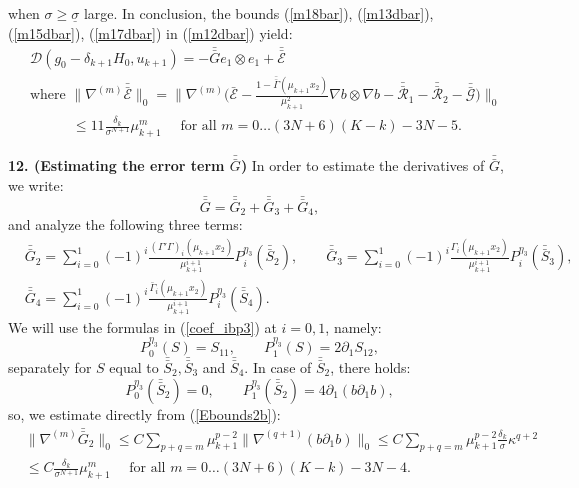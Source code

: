 \documentclass[reqno,twoside,11pt]{amsart}
\newcommand*{\dbar}[1]{\bar{\bar{#1}}}
\numberwithin{equation}{section}
\theoremstyle{plain}
\theoremstyle{definition}
\begin{document}
when $\sigma\geq \underline\sigma$ large.
In conclusion, the bounds (\ref{m18bar}), (\ref{m13dbar}), 
(\ref{m15dbar}), (\ref{m17dbar})  in (\ref{m12dbar}) yield:
\begin{equation}\label{m18dbar}
\begin{split}
& \mathcal{D}(g_0-\delta_{k+1}H_0, u_{k+1}) = - \dbar G e_1\otimes e_1 + \dbar{\mathcal{E}} \\
&\mbox{where } \|\nabla^{(m)}\dbar{\mathcal{E}}\|_0  =
\big\|\nabla^{(m)}\Big(\bar{\mathcal{E}} -
\frac{1-\dbar\Gamma(\mu_{k+1}x_2)}{\mu_{k+1}^2}\nabla b\otimes\nabla b
- \dbar{\mathcal{R}}_1 - \dbar{\mathcal{R}}_2-\dbar{\mathcal{G}}\Big)\big\|_0
\\ & \qquad\quad \leq 11\frac{\delta_k}{\sigma^{N+1}}\mu_{k+1}^m 
\quad \mbox{ for all } m=0\ldots (3N+6)(K-k)-3N-5.
\end{split}
\end{equation}

\smallskip

{\bf 12. (Estimating the error term $\dbar G$)}
In order to estimate the derivatives of $\dbar G$, we write:
$$\dbar G = \dbar G_2 + \dbar G_3 + \dbar G_4,$$
and analyze the following three terms: 
\begin{equation*}
\begin{split}
& \dbar G_2 = \sum_{i=0}^1 (-1)^i \frac{(\Gamma'\Gamma)_{i}(\mu_{k+1}x_2
  )}{\mu_{k+1}^{i+1}}P_i^{\eta_3}(\dbar S_2), \qquad
\dbar G_3 =\sum_{i=0}^1 (-1)^i \frac{\Gamma_{i}(\mu_{k+1}x_2
  )}{\mu_{k+1}^{i+1}}P_i^{\eta_3}(\dbar S_3), 
\\ & \dbar G_4 =\sum_{i=0}^1 (-1)^i \frac{\bar\Gamma_{i}(\mu_{k+1} x_2
  )}{\mu_{k+1}^{i+1}}P_i^{\eta_3}(\dbar S_4). 
\end{split}
\end{equation*}
We will use the formulas in (\ref{coef_ibp3}) at $i=0,1$, namely:
\begin{equation}\label{fora}
P_0^{\eta_3}(S) = S_{11}, \qquad P_1^{\eta_3}(S)=2\partial_1S_{12},
\end{equation}
separately for $S$ equal to $\dbar S_2, \dbar S_3$ and $\dbar S_4$.
In case of $\dbar S_2$, there holds:
$$P_0^{\eta_3}(\dbar S_2) = 0, \qquad P_1^{\eta_3}(\dbar S_2) = 4\partial_1(b\partial_1b),$$
so, we estimate directly from (\ref{Ebounds2b}):
\begin{equation}\label{dbG2}
\begin{split}
& \|\nabla^{(m)}\dbar G_2\|_0  \leq C \sum_{p+q=m}
\mu_{k+1}^{p-2}\|\nabla^{(q+1)}(b\partial_1b)\|_0 \leq 
C \sum_{p+q=m} \mu_{k+1}^{p-2}\frac{\delta_k}{\sigma}\kappa^{q+2}
\\ & \leq C \frac{\delta_k}{\sigma^{N+1}}\mu_{k+1}^m \quad  \mbox{ for all } 
m=0\ldots (3N+6)(K-k)-3N-4.
\end{split}
\end{equation}
\end{document}

